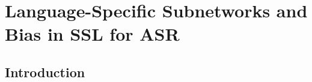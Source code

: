 


\chapter{Language-Specific Subnetworks and Bias in SSL for ASR}
\label{chapter4}%






\section{Introduction}\label{pru_sec:introduction} %


